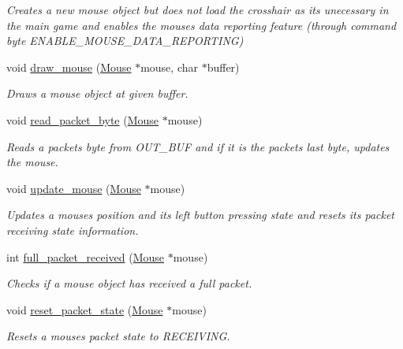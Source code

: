 \begin{DoxyCompactItemize}
\begin{DoxyCompactList}\small\item\em Creates a new mouse \textquotesingle{}object\textquotesingle{} but does not load the crosshair as it\textquotesingle{}s unecessary in the main game and enables the mouse\textquotesingle{}s data reporting feature (through command byte E\+N\+A\+B\+L\+E\+\_\+\+M\+O\+U\+S\+E\+\_\+\+D\+A\+T\+A\+\_\+\+R\+E\+P\+O\+R\+T\+I\+NG) \end{DoxyCompactList}\item 
void \hyperlink{group__mouse_ga533cb6e203c7fbd6e78e3326d32eeb78}{draw\+\_\+mouse} (\hyperlink{struct_mouse}{Mouse} $\ast$mouse, char $\ast$buffer)
\begin{DoxyCompactList}\small\item\em Draws a mouse \textquotesingle{}object\textquotesingle{} at given buffer. \end{DoxyCompactList}\item 
void \hyperlink{group__mouse_gae7c7eaeeb93ad9d3985b149279b7e142}{read\+\_\+packet\+\_\+byte} (\hyperlink{struct_mouse}{Mouse} $\ast$mouse)
\begin{DoxyCompactList}\small\item\em Reads a packet\textquotesingle{}s byte from O\+U\+T\+\_\+\+B\+UF and if it is the packet\textquotesingle{}s last byte, updates the mouse. \end{DoxyCompactList}\item 
void \hyperlink{group__mouse_ga89d5f7399006fac6c3e5e0300bd34869}{update\+\_\+mouse} (\hyperlink{struct_mouse}{Mouse} $\ast$mouse)
\begin{DoxyCompactList}\small\item\em Updates a mouse\textquotesingle{}s position and its left button pressing state and resets its packet receiving state information. \end{DoxyCompactList}\item 
int \hyperlink{group__mouse_gae1e0937813a3d320ad6325616bd2b09e}{full\+\_\+packet\+\_\+received} (\hyperlink{struct_mouse}{Mouse} $\ast$mouse)
\begin{DoxyCompactList}\small\item\em Checks if a mouse \textquotesingle{}object\textquotesingle{} has received a full packet. \end{DoxyCompactList}\item 
void \hyperlink{group__mouse_gaca7e11158ac82e48f958b7517f6123d4}{reset\+\_\+packet\+\_\+state} (\hyperlink{struct_mouse}{Mouse} $\ast$mouse)
\begin{DoxyCompactList}\small\item\em Resets a mouse\textquotesingle{}s packet state to R\+E\+C\+E\+I\+V\+I\+NG. \end{DoxyCompactList}\item 

\end{DoxyCompactItemize}
